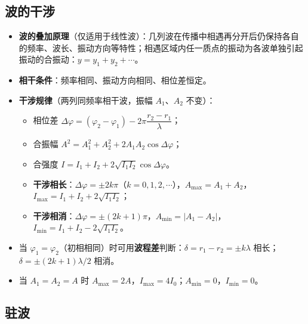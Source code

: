 \documentclass[12pt,a4paper]{ctexart}
\begin{document}
\subsection{波的干涉}

\begin{itemize}
    \item \textbf{波的叠加原理}（仅适用于线性波）：几列波在传播中相遇再分开后仍保持各自的频率、波长、振动方向等特性；相遇区域内任一质点的振动为各波单独引起振动的合振动：$y = y_1+y_2+\cdots$。
    \item \textbf{相干条件}：频率相同、振动方向相同、相位差恒定。
    \item \textbf{干涉规律}（两列同频率相干波，振幅 $A_1$、$A_2$ 不变）：
    \begin{itemize}
        \item 相位差 $\Delta\varphi = (\varphi_2-\varphi_1) - 2\pi\dfrac{r_2-r_1}{\lambda}$；
        \item 合振幅 $A^2 = A_1^2+A_2^2+2A_1A_2\cos\Delta\varphi$；
        \item 合强度 $I = I_1+I_2+2\sqrt{I_1I_2}\cos\Delta\varphi$。
        \item \textbf{干涉相长}：$\Delta\varphi = \pm 2k\pi$（$k=0,1,2,\cdots$），$A_{\max}=A_1+A_2$，$I_{\max}=I_1+I_2+2\sqrt{I_1I_2}$；
        \item \textbf{干涉相消}：$\Delta\varphi = \pm(2k+1)\pi$，$A_{\min}=|A_1-A_2|$，$I_{\min}=I_1+I_2-2\sqrt{I_1I_2}$。
    \end{itemize}
    \item 当 $\varphi_1=\varphi_2$（初相相同）时可用\textbf{波程差}判断：$\delta = r_1-r_2 = \pm k\lambda$ 相长；$\delta = \pm(2k+1)\lambda/2$ 相消。
    \item 当 $A_1=A_2=A$ 时 $A_{\max}=2A$，$I_{\max}=4I_0$；$A_{\min}=0$，$I_{\min}=0$。
\end{itemize}

\subsection{驻波}
\end{document}
